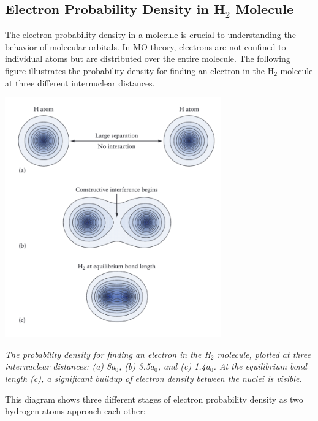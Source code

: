 \documentclass{report}
\begin{document}
\subsection{Electron Probability Density in H$_2$ Molecule}

The electron probability density in a molecule is crucial to understanding the behavior of molecular orbitals. In MO theory, electrons are not confined to individual atoms but are distributed over the entire molecule. The following figure illustrates the probability density for finding an electron in the H$_2$ molecule at three different internuclear distances.

\begin{center}
	\includegraphics[width=0.7\textwidth]{2.png}
\end{center}
\textit{The probability density for finding an electron in the H$_2$ molecule, plotted at three internuclear distances: (a) 8a$_0$, (b) 3.5a$_0$, and (c) 1.4a$_0$. At the equilibrium bond length (c), a significant buildup of electron density between the nuclei is visible.}

This diagram shows three different stages of electron probability density as two hydrogen atoms approach each other:
\end{document}
